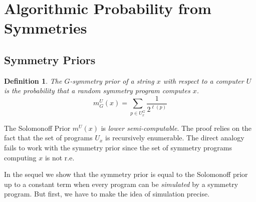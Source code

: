 \documentclass{article}
\newtheorem{definition}[theorem]{Definition}
\newcommand{\TB}{\mathtt{TB}}
\newcommand{\m}{m^U}
\newcommand{\ms}{m^U_G}
\begin{document}
\section{Algorithmic Probability from Symmetries}

\subsection{Symmetry Priors}




\begin{definition}
The $G$-\emph{symmetry prior} of a string $x$ with respect to a computer $U$ is the probability that a random symmetry program computes $x$. 
\begin{equation}
    \ms(x) = \sum_{p \in U_x^G} \frac{1}{2^{\ell(p)}}
\end{equation}
\end{definition}

The Solomonoff Prior $\m(x)$ is \emph{lower semi-computable}. The proof relies on the fact that the set of programs $U_x$ is recursively enumerable. The direct analogy fails to work with the symmetry prior since the set of symmetry programs computing $x$ is not r.e.

In the sequel we show that the symmetry prior is equal to the Solomonoff prior up to a constant term when every program can be \emph{simulated} by a symmetry program. But first, we have to make the idea of simulation precise. 
\end{document}

